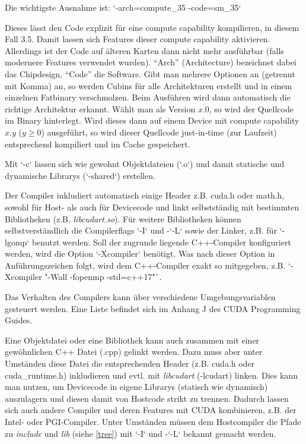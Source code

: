 			Die wichtigste Ausnahme ist: \li`-arch=compute_35 -code=sm_35`
		
			Dieses lässt den Code explizit für eine \gls{compute capability} kompilieren, in diesem Fall 3.5. Damit lassen sich Features dieser \gls{compute capability} aktivieren. Allerdings ist der Code auf älteren Karten dann nicht mehr ausführbar (falls modernere Features verwendet wurden). \enquote{Arch} (Architecture) bezeichnet dabei das Chipdesign, \enquote{Code} die Software. Gibt man mehrere Optionen an (getrennt mit Komma) an, so werden Cubins für alle Architekturen erstellt und in einem einzelnen Fatbinary verschmolzen. Beim Ausführen wird dann automatisch die richtige Architektur erkannt. Wählt man als Version $x.0$, so wird der Quellcode im Binary hinterlegt. Wird dieses dann auf einem Device mit \gls{compute capability} $x.y$ ($y \geq 0$) ausgeführt, so wird dieser Quellcode just-in-time (zur Laufzeit) entsprechend kompiliert und im Cache gespeichert. 
		
			Mit \li`-c` lassen sich wie gewohnt Objektdateien (\li`.o`) und damit statische und dynamische Librarys (\li`-shared`) erstellen.
		
			Der Compiler inkludiert automatisch einige Header z.B. cuda.h oder math.h, sowohl für Host- als auch für Devicecode und linkt selbstständig mit bestimmten Bibliotheken (z.B. \textit{libcudart.so}). Für weitere Bibliotheken können selbstverständlich die Compilerflags \li`-I` und -\li`-L` sowie der Linker, z.B. für \li`-lgomp` benutzt werden.
			Soll der zugrunde liegende C++-Compiler konfiguriert werden, wird die Option \li`-Xcompiler` benötigt. Was nach dieser Option in Anführungszeichen folgt, wird dem C++-Compiler exakt so mitgegeben, z.B. \li`-Xcompiler "-Wall -fopenmp -std=c++17"`.
		
			Das Verhalten des Compilers kann über verschiedene Umgebungsvariablen gesteuert werden. Eine Liste befindet sich im Anhang J des CUDA Programming Guides. \autocite{cudaPG} 
		
			Eine Objektdatei oder eine Bibliothek kann auch zusammen mit einer gewöhnlichen C++ Datei (.cpp) gelinkt werden. Dazu muss aber unter Umständen diese Datei die entsprechenden Header (z.B. cuda.h oder cuda{\_}runtime.h) inkludieren und evtl. mit \textit{libcudart} (-lcudart) linken. Dies kann man nutzen, um Devicecode in eigene Librarys (statisch wie dynamisch) auszulagern und diesen damit von Hostcode strikt zu trennen. Dadurch lassen sich auch andere Compiler und deren Features mit CUDA kombinieren, z.B. der Intel- oder PGI-Compiler. Unter Umständen müssen dem Hostcompiler die Pfade zu \textit{include} und \textit{lib} (siehe \ref{tree}) mit \li`-I` und -\li`-L` bekannt gemacht werden.
